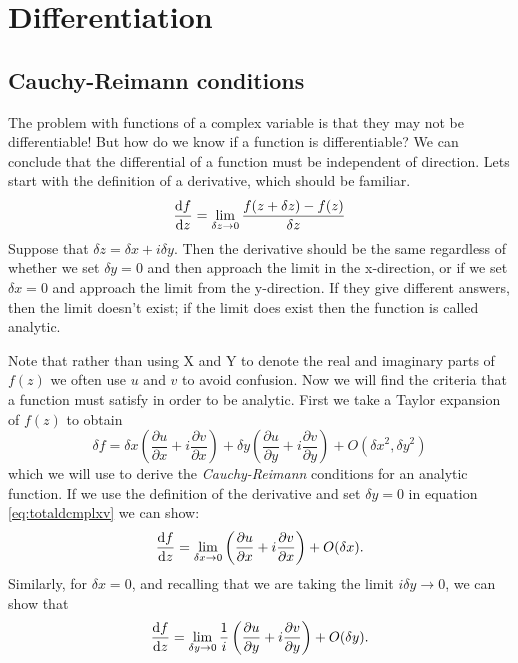 \section{Differentiation}
\subsection{Cauchy-Reimann conditions}
The problem with functions of a complex variable is that they may not be differentiable!
 But how do we know if a function is differentiable? 
 We can conclude that the differential of a function must be independent of direction.
 Lets start with the definition of a derivative, which should be familiar.
%
\begin{equation*}
\frac{\mathop{}\!\mathrm{d} f}{\mathop{}\!\mathrm{d} z}=\lim_{\delta z\to 0}\frac{f(z+\delta z)-f(z)}{\delta z}
\end{equation*}
%
Suppose that $\delta z=\delta x + i\delta y$.
 Then the derivative should be the same regardless of whether we set $\delta y=0$ and then approach the limit in the x-direction, or if we set $\delta x=0$ and approach the limit from the y-direction.
 If they give different answers, then the limit doesn't exist; if the limit does exist then the function is called analytic.
\par 
Note that rather than using X and Y to denote the real and imaginary parts of $f(z)$ we often use $u$ and $v$ to avoid confusion.
 Now we will find the criteria that a function must satisfy in order to be analytic.
 First we take a Taylor expansion of $f(z)$ to obtain
%
\begin{equation}
	 \label{eq:totaldcmplxv}
	 \delta f=\delta x \left(\frac{\partial u}{\partial x} + i \frac{\partial v}{\partial x}\right) + \delta y \left(\frac{\partial u}{\partial y}+i\frac{\partial v}{\partial y}\right) + O\left({\delta x}^2,{\delta y}^2\right)
\end{equation}
%
 which we will use to derive the \emph{Cauchy-Reimann} conditions for an analytic function.
 If we use the definition of the derivative and set $\delta y=0$ in equation \ref{eq:totaldcmplxv} we can show:
%
\begin{equation*}
	\frac{\mathop{}\!\mathrm{d} f}{\mathop{}\!\mathrm{d} z}=\lim_{\delta x\to 0}\left(\frac{\partial u}{\partial x} + i \frac{\partial v}{\partial x}\right) + O(\delta x).
\end{equation*}
%
Similarly, for $\delta x=0$, and recalling that we are taking the limit $i\delta y \rightarrow 0$, we can show that
%
\begin{equation*}
\frac{\mathop{}\!\mathrm{d} f}{\mathop{}\!\mathrm{d} z}=\lim_{\delta y\to 0}\frac{1}{i}\left(\frac{\partial u}{\partial y} + i \frac{\partial v}{\partial y}\right) + O(\delta y).
\end{equation*}
